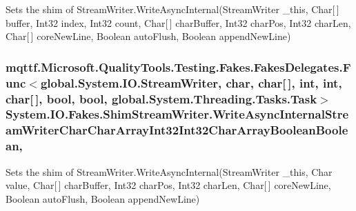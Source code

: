 Sets the shim of Stream\-Writer.\-Write\-Async\-Internal(\-Stream\-Writer \-\_\-this, Char\mbox{[}$\,$\mbox{]} buffer, Int32 index, Int32 count, Char\mbox{[}$\,$\mbox{]} char\-Buffer, Int32 char\-Pos, Int32 char\-Len, Char\mbox{[}$\,$\mbox{]} core\-New\-Line, Boolean auto\-Flush, Boolean append\-New\-Line)

\hypertarget{class_system_1_1_i_o_1_1_fakes_1_1_shim_stream_writer_a5d261bb915a7467b37fb07caca455b2b}{
\subsubsection[{Write\-Async\-Internal\-Stream\-Writer\-Char\-Char\-Array\-Int32\-Int32\-Char\-Array\-Boolean\-Boolean}]{\setlength{\rightskip}{0pt plus 5cm}mqttf.\-Microsoft.\-Quality\-Tools.\-Testing.\-Fakes.\-Fakes\-Delegates.\-Func$<$global.\-System.\-I\-O.\-Stream\-Writer, char, char\mbox{[}$\,$\mbox{]}, int, int, char\mbox{[}$\,$\mbox{]}, bool, bool, global.\-System.\-Threading.\-Tasks.\-Task$>$ System.\-I\-O.\-Fakes.\-Shim\-Stream\-Writer.\-Write\-Async\-Internal\-Stream\-Writer\-Char\-Char\-Array\-Int32\-Int32\-Char\-Array\-Boolean\-Boolean\hspace{0.3cm}{\ttfamily [static]}, {\ttfamily [set]}}}\label{class_system_1_1_i_o_1_1_fakes_1_1_shim_stream_writer_a5d261bb915a7467b37fb07caca455b2b}


Sets the shim of Stream\-Writer.\-Write\-Async\-Internal(\-Stream\-Writer \-\_\-this, Char value, Char\mbox{[}$\,$\mbox{]} char\-Buffer, Int32 char\-Pos, Int32 char\-Len, Char\mbox{[}$\,$\mbox{]} core\-New\-Line, Boolean auto\-Flush, Boolean append\-New\-Line)

